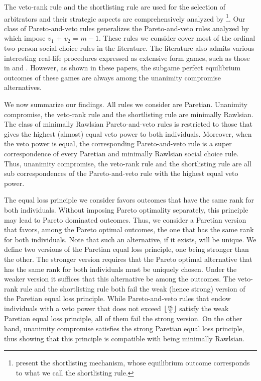 \documentclass[version=3.21, pagesize, twoside=off, bibliography=totoc, DIV=calc, fontsize=12pt, a4paper]{scrartcl}
\begin{document}
The veto-rank rule and the shortlisting rule are used for the selection of arbitrators and their strategic aspects are comprehensively analyzed by \citet{Clippel}%
\footnote{ present the shortlisting mechanism, whose equilibrium outcome corresponds to what we call the shortlisting rule.}. Our class of Pareto-and-veto rules generalizes the Pareto-and-veto rules analyzed by \citet{laslier2021solution} which impose $v_1$ + $v_2$ = $m-1$. These rules we consider cover most of the ordinal two-person social choice rules in the literature. The literature also admits various interesting real-life procedures expressed as extensive form games, such as those in \citet{anbarci1993noncooperative, anbarci2006finite} and \citet{barbera2022compromising}. However, as shown in these papers, the subgame perfect equilibrium outcomes of these games are always among the unanimity compromise alternatives. 

We now summarize our findings. All rules we consider are Paretian. Unanimity compromise, the veto-rank rule and the shortlisting rule are minimally Rawlsian. The class of minimally Rawlsian Pareto-and-veto rules is restricted to those that gives the highest (almost) equal veto power to both individuals. Moreover, when the veto power is equal, the corresponding Pareto-and-veto rule is a super correspondence of every Paretian and minimally Rawlsian social choice rule. Thus, unanimity compromise, the veto-rank rule and the shortlisting rule are all sub correspondences of the Pareto-and-veto rule with the highest equal veto power.

The equal loss principle we consider favors outcomes that have the same rank for both individuals. Without imposing Pareto optimality separately, this principle may lead to Pareto dominated outcomes. Thus, we consider a Paretian version that favors, among the Pareto optimal outcomes, the one that has the same rank for both individuals. Note that such an alternative, if it exists, will be unique. We define two versions of the Paretian equal loss principle, one being stronger than the other. The stronger version requires that the Pareto optimal alternative that has the same rank for both individuals must be uniquely chosen. Under the weaker version it suffices that this alternative be among the outcomes. The veto-rank rule and the shortlisting rule both fail the weak (hence strong) version of the Paretian equal loss principle. While Pareto-and-veto rules that endow individuals with a veto power that does not exceed $\lfloor\frac{m}{2}\rfloor$ satisfy the weak Paretian equal loss principle, all of them fail the strong version. On the other hand, unanimity compromise satisfies the strong Paretian equal loss principle, thus showing that this principle is compatible with being minimally Rawlsian.
 
\end{document}
